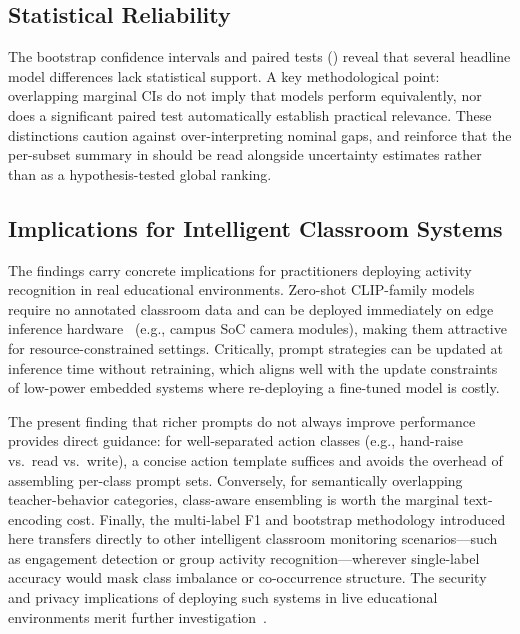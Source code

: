 \documentclass[symmetry,article,submit,pdftex,moreauthors]{Definitions/mdpi}
\begin{document}
\subsection{Statistical Reliability}
\label{sec:discuss_bootstrap}

The bootstrap confidence intervals and paired tests () reveal that several headline model differences lack statistical support. A key methodological point: overlapping marginal CIs do not imply that models perform equivalently, nor does a significant paired test automatically establish practical relevance. These distinctions caution against over-interpreting nominal gaps, and reinforce that the per-subset summary in  should be read alongside uncertainty estimates rather than as a hypothesis-tested global ranking.

\subsection{Implications for Intelligent Classroom Systems}

The findings carry concrete implications for practitioners deploying activity recognition in real educational environments. Zero-shot CLIP-family models require no annotated classroom data and can be deployed immediately on edge inference hardware~\cite{ma2026agentic_ai} (e.g., campus SoC camera modules), making them attractive for resource-constrained settings. Critically, prompt strategies can be updated at inference time without retraining, which aligns well with the update constraints of low-power embedded systems where re-deploying a fine-tuned model is costly.

The present finding that richer prompts do not always improve performance provides direct guidance: for well-separated action classes (e.g., hand-raise vs.\ read vs.\ write), a concise action template suffices and avoids the overhead of assembling per-class prompt sets. Conversely, for semantically overlapping teacher-behavior categories, class-aware ensembling is worth the marginal text-encoding cost. Finally, the multi-label F1 and bootstrap methodology introduced here transfers directly to other intelligent classroom monitoring scenarios---such as engagement detection or group activity recognition---wherever single-label accuracy would mask class imbalance or co-occurrence structure. The security and privacy implications of deploying such systems in live educational environments merit further investigation~\cite{deng2025hardening_llm}.
\end{document}
